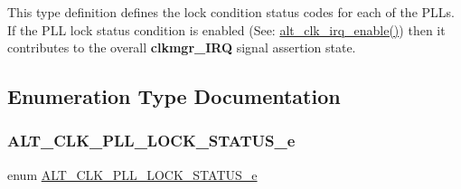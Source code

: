 This type definition defines the lock condition status codes for each of the P\+L\+Ls. If the P\+LL lock status condition is enabled (See\+: \mbox{\hyperlink{group__CLK__MGR__INT_ga8dac52ec4e5a203a697ce86a8a893fdd}{alt\+\_\+clk\+\_\+irq\+\_\+enable()}}) then it contributes to the overall {\bfseries{clkmgr\+\_\+\+I\+RQ}} signal assertion state. 

\subsection{Enumeration Type Documentation}
\mbox{\label{group__CLK__MGR__STATUS_gafe0eda739fa3d56ec20c0ea5b328cb49}} 
\subsubsection{\texorpdfstring{ALT\_CLK\_PLL\_LOCK\_STATUS\_e}{ALT\_CLK\_PLL\_LOCK\_STATUS\_e}}
{\footnotesize\ttfamily enum \mbox{\hyperlink{group__CLK__MGR__STATUS_gafe0eda739fa3d56ec20c0ea5b328cb49}{A\+L\+T\+\_\+\+C\+L\+K\+\_\+\+P\+L\+L\+\_\+\+L\+O\+C\+K\+\_\+\+S\+T\+A\+T\+U\+S\+\_\+e}}}

